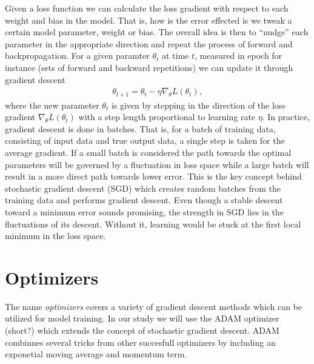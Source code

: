 Given a loss function we can calculate the loss gradient with respect to each weight and bias in the model. That is, how is the error effected is we tweak a certain model parameter, weight or bias. The overall idea is then to  ``nudge'' each parameter in the appropriate direction and repeat the process of forward and backpropagation. For a given paramter $\theta_t$ at time $t$, measured in epoch for instance (sets of forward and backward repetitions) we can update it through gradient descent 
\begin{align*}
  \theta_{t+1} = \theta_t - \eta \nabla_\theta L(\theta_t),
\end{align*}
where the new parameter $\theta_t$ is given by stepping in the direction of the loss gradient $\nabla_\theta L(\theta_t)$ with a step length proportional to learning rate $\eta$. In practice, gradient descent is done in batches. That is, for a batch of training data, consisting of input data and true output data, a single step is taken for the average gradient. If a small batch is considered the path towards the optimal parameters will be governed by a fluctuation in loss space while a large batch will result in a more direct path towards lower error. This is the key concept behind stochastic gradient descent (SGD) which creates random batches from the training data and performs gradient descent. Even though a stable descent toward a minimum error sounds promising, the strength in \acrshort{SGD} lies in the fluctuations of its descent. Without it, learning would be stuck at the first local minimum in the loss space. 


\section{Optimizers}
The name \textit{optimizers} covers a variety of gradient descent methods which can be utilized for model training. In our study we will use the ADAM optimizer (short?) which extends the concept of stochastic gradient descent. ADAM combinnes several tricks from other succesfull optimizers by including an exponetial moving average and momentum term. 


